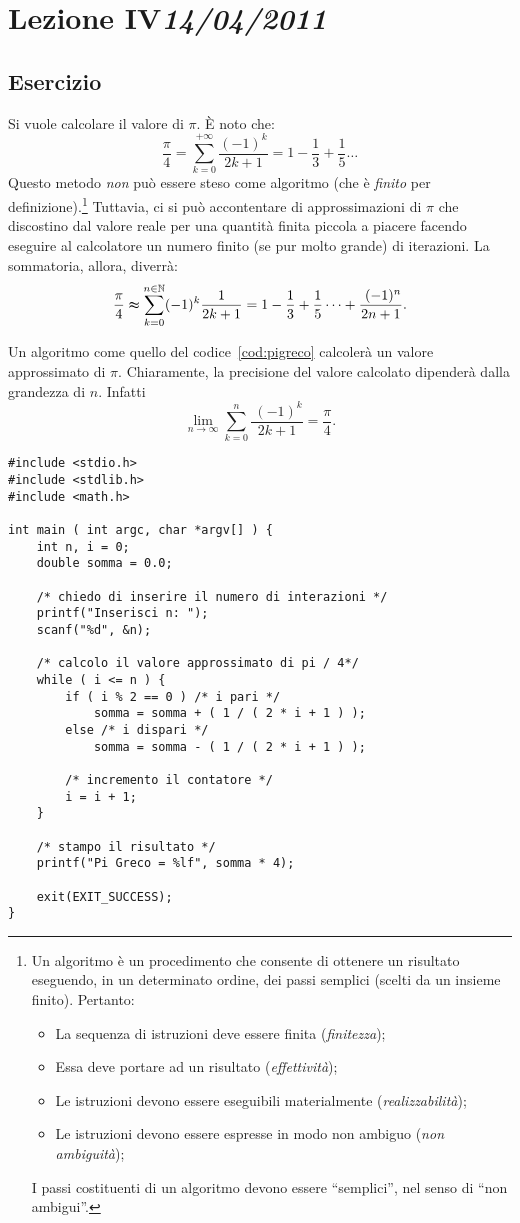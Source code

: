 \chapter[Lezione IV]{Lezione IV\newline\small{\emph{14/04/2011}}}
	\section{Esercizio}
Si vuole calcolare il valore di $\pi$. \`E noto che:
\[
\frac{\pi}{4}=\sum_{k=0}^{+\infty}\frac{(-1)^k}{2k+1}=1-\frac{1}{3}+\frac{1}{5}\dots
\]
Questo metodo \emph{non} può essere steso come algoritmo (che è \emph{finito} per definizione).\footnote{Un algoritmo è un procedimento che consente di ottenere un risultato eseguendo, in un determinato ordine, dei passi semplici (scelti da un insieme finito). Pertanto:
\begin{itemize}[noitemsep]
	\item
La sequenza di istruzioni deve essere finita (\emph{finitezza});
	\item
Essa deve portare ad un risultato (\emph{effettività});
	\item
Le istruzioni devono essere eseguibili materialmente (\emph{realizzabilità});
	\item
Le istruzioni devono essere espresse in modo non ambiguo (\emph{non ambiguità});
\end{itemize}   
I passi costituenti di un algoritmo devono essere ``semplici'', nel senso di ``non ambigui''.}
Tuttavia, ci si può accontentare di approssimazioni di $\pi$ che discostino dal valore reale per una quantità finita piccola a piacere facendo eseguire al calcolatore un numero finito (se pur molto grande) di iterazioni.
La sommatoria, allora, diverrà:
\[
\frac{\pi}{4} \thickapprox \sum_{k=0}^{n\in\mathbb{N}}(-1)^k\frac{1}{2k+1}=1-\frac{1}{3}+\frac{1}{5}\dots+\frac{\ (-1)^n}{2n+1}.
\]

Un algoritmo come quello del codice~\vref{cod:pigreco} calcolerà un valore approssimato di $\pi$.
Chiaramente, la precisione del valore calcolato dipenderà dalla grandezza di $n$.
Infatti
\[
\lim_{n\to\infty}\sum_{k=0}^n\frac{\ (-1)^k}{2k+1} =\frac{\pi}{4}.
\]
\begin{lstlisting}[caption={\em Calcolo del valore approssimato di $\pi$.}, label={cod:pigreco}]
#include <stdio.h>
#include <stdlib.h>
#include <math.h>

int main ( int argc, char *argv[] ) {
	int n, i = 0;
	double somma = 0.0;

	/* chiedo di inserire il numero di interazioni */
	printf("Inserisci n: ");
	scanf("%d", &n);

	/* calcolo il valore approssimato di pi / 4*/
	while ( i <= n ) {
		if ( i % 2 == 0 ) /* i pari */
			somma = somma + ( 1 / ( 2 * i + 1 ) );
		else /* i dispari */
			somma = somma - ( 1 / ( 2 * i + 1 ) );

		/* incremento il contatore */
		i = i + 1;
	}

	/* stampo il risultato */
	printf("Pi Greco = %lf", somma * 4);

	exit(EXIT_SUCCESS);
}
\end{lstlisting}
